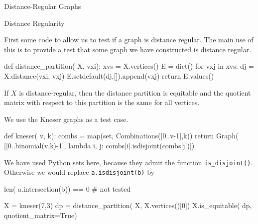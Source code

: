 \begin{chap}{Distance-Regular Graphs}
%
\begin{sect}{Distance Regularity}
%
\begin{para}
First some code to allow us to test if a graph is distance regular.
The main use of this is to provide a test that some graph we have constructed is
distance regular.
\end{para}
%
\begin{sagecode}
\begin{sageinput}
def distance_partition( X, vxi):
    xvs = X.vertices()
    E = dict()
    for vxj in xvs:
        dj = X.distance(vxi, vxj)
        E.setdefault(dj,[]).append(vxj)
    return E.values()    
\end{sageinput}
\end{sagecode}
%    
\begin{para}
If $X$ is distance-regular, then the distance partition is equitable
and the quotient matrix with respect to this partition is the same for all
vertices. 
\end{para}
%
\begin{para}
We use the Kneser graphs as a test case.
\end{para}
%
%
\begin{sagecode}
\begin{sageinput}
def kneser( v, k):
    combs = map(set, Combinations([0..v-1],k))
    return Graph( [[0..binomial(v,k)-1], lambda i, j: combs[i].isdisjoint(combs[j])])
\end{sageinput}
\end{sagecode}
%
\begin{para}
We have used Python sets here, because they admit the function \verb|is_disjoint()|.
Otherwise we would replace \verb|a.isdisjoint(b)| by
\end{para}
%
\begin{sagecode}
\begin{sageinput}
len( a.intersection(b)) == 0 # not tested
\end{sageinput}
\end{sagecode}
%
\begin{sagecode}
\begin{sageinput}
X = kneser(7,3)
dp = distance_partition( X, X.vertices()[0])
X.is_equitable( dp, quotient_matrix=True) 
\end{sageinput}
\begin{sageoutput}
[0 4 0 0]                                                                                                             

\end{sageoutput}
\end{sagecode}
\end{sect}
\end{chap}
